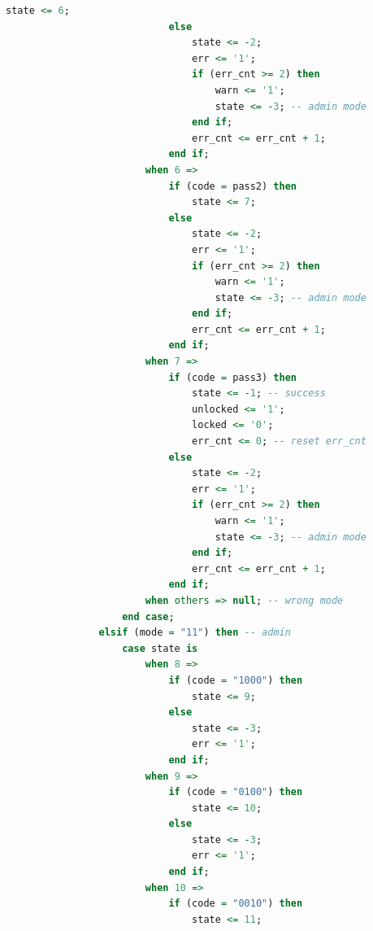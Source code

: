 \documentclass[a4paper]{article}
\begin{document}
\begin{lstlisting}[language=vhdl]
                                state <= 6;
                            else
                                state <= -2;
                                err <= '1';
                                if (err_cnt >= 2) then
                                    warn <= '1';
                                    state <= -3; -- admin mode
                                end if;
                                err_cnt <= err_cnt + 1;
                            end if;
                        when 6 =>
                            if (code = pass2) then
                                state <= 7;
                            else
                                state <= -2;
                                err <= '1';
                                if (err_cnt >= 2) then
                                    warn <= '1';
                                    state <= -3; -- admin mode
                                end if;
                                err_cnt <= err_cnt + 1;
                            end if;
                        when 7 =>
                            if (code = pass3) then
                                state <= -1; -- success
                                unlocked <= '1';
                                locked <= '0';
                                err_cnt <= 0; -- reset err_cnt
                            else
                                state <= -2;
                                err <= '1';
                                if (err_cnt >= 2) then
                                    warn <= '1';
                                    state <= -3; -- admin mode
                                end if;
                                err_cnt <= err_cnt + 1;
                            end if;
                        when others => null; -- wrong mode
                    end case;
                elsif (mode = "11") then -- admin
                    case state is
                        when 8 =>
                            if (code = "1000") then
                                state <= 9;
                            else
                                state <= -3;
                                err <= '1';
                            end if;
                        when 9 =>
                            if (code = "0100") then
                                state <= 10;
                            else
                                state <= -3;
                                err <= '1';
                            end if;
                        when 10 =>
                            if (code = "0010") then
                                state <= 11;

\end{lstlisting}
\end{document}
